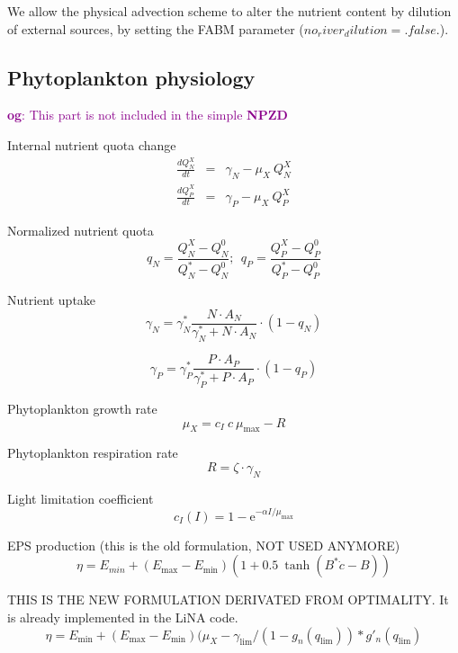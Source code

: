 \documentclass[fleqn]{article}                     %
\newcommand{\comment}[3][darkmagenta]{\textcolor{#1}{\textbf{#2}: #3}}
\begin{document}
We allow the physical advection scheme to alter the nutrient content by dilution of external sources, by setting the FABM parameter ($no_river_dilution=.false.$).

\subsection{Phytoplankton physiology}
\comment{og}{This part is not included in the simple \textbf{NPZD}}

Internal nutrient quota change
\begin{eqnarray}
  \frac{dQ^X_N}{dt} &=&  \gamma_N - \mu_X \  Q^X_N \\
  \frac{dQ^X_P}{dt} &=&  \gamma_P- \mu_X \  Q^X_P
\end{eqnarray}

Normalized nutrient quota
\begin{equation}
  q_N = \frac{Q^X_N-Q^0_N}{Q^*_N-Q^0_N};\ \ q_P = \frac{Q^X_P-Q^0_P}{Q^*_P-Q^0_P}
\end{equation}

Nutrient uptake
\begin{equation}
  \gamma_N = \gamma^*_N \frac{N \cdot A_N}{\gamma^*_N+ N \cdot A_N} \cdot (1-q_N)
\end{equation}

\begin{equation}
  \gamma_P = \gamma^*_P \frac{P \cdot A_P}{\gamma^*_P + P \cdot A_P} \cdot (1-q_P)
\end{equation}

Phytoplankton growth rate
\begin{equation}
  \mu_X= c_I\  c\  \mu_{\text{max}} - R
\end{equation}

Phytoplankton respiration rate
\begin{equation}
  R = \zeta \cdot \gamma_N
\end{equation}

Light limitation coefficient
\begin{equation}
  c_I(I) = 1-\textrm{e}^{-\alpha I/ \mu_{\text{max}}}
\end{equation}

EPS production (this is the old formulation, NOT USED ANYMORE)
\begin{equation*}
  \eta = E_{min} + (E_{\textrm{max}}-E_{\textrm{min}})(1+0.5\ \tanh(B^*\dot{c}-B))
\end{equation*}

THIS IS THE NEW FORMULATION DERIVATED FROM OPTIMALITY.
It is already implemented in the LiNA code.
\begin{equation}
  \eta = E_{\textrm{min}} + (E_{\textrm{max}}-E_{\textrm{min}})(\mu_X-\gamma_{\lim}/(1-g_n(q_{\lim}))*g'_n(q_{\lim})
\end{equation}
\end{document}
